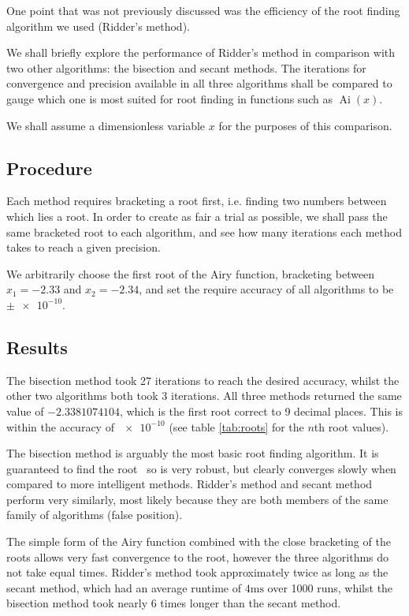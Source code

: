 \documentclass[]{article}
\newcommand{\Ai}[1]{\ensuremath{\operatorname{Ai}({#1})}}
\begin{document}
One point that was not previously discussed was the efficiency of the root finding algorithm we used (Ridder's method).

We shall briefly explore the performance of Ridder's method in comparison with two other algorithms: the bisection and secant methods. The iterations for convergence and precision available in all three algorithms shall be compared to gauge which one is most suited for root finding in functions such as \Ai{x}.

We shall assume a dimensionless variable $x$ for the purposes of this comparison.

\subsection{Procedure}\label{ssec:procedure}

Each method requires bracketing a root first, i.e. finding two numbers between which lies a root. In order to create as fair a trial as possible, we shall pass the same bracketed root to each algorithm, and see how many iterations each method takes to reach a given precision.

We arbitrarily choose the first root of the Airy function, bracketing between $x_{1} = -2.33$ and $x_{2} = -2.34$, and set the require accuracy of all algorithms to be $\pm\num{e-10}$.

\subsection{Results}\label{ssec:results}

The bisection method took 27 iterations to reach the desired accuracy, whilst the other two algorithms both took 3 iterations. All three methods returned the same value of  $-2.3381074104$, which is the first root correct to 9 decimal places. This is within the accuracy of $\num{e-10}$ (see table \ref{tab:roots} for the $n$th root values).

The bisection method is arguably the most basic root finding algorithm. It is guaranteed to find the root~\cite{ref:nr} so is very robust, but clearly converges slowly when compared to more intelligent methods. Ridder's method and secant method perform very similarly, most likely because they are both members of the same family of algorithms (false position).

The simple form of the Airy function combined with the close bracketing of the roots allows very fast convergence to the root, however the three algorithms do not take equal times. Ridder's method took approximately twice as long as the secant method, which had an average runtime of $4\si{\milli\second}$ over 1000 runs, whilst the bisection method took nearly 6 times longer than the secant method.
\end{document}

